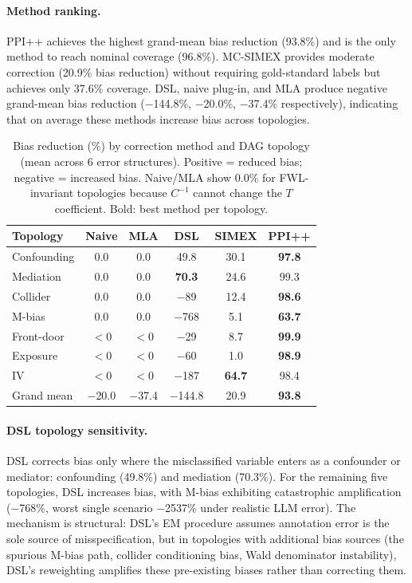 \paragraph{Method ranking.}
PPI++ achieves the highest grand-mean bias reduction (93.8\%) and is the only method to reach nominal coverage (96.8\%). MC-SIMEX provides moderate correction (20.9\% bias reduction) without requiring gold-standard labels but achieves only 37.6\% coverage. DSL, naive plug-in, and MLA produce negative grand-mean bias reduction ($-$144.8\%, $-$20.0\%, $-$37.4\% respectively), indicating that on average these methods increase bias across topologies.

\begin{table}[t]
\centering
\caption{Bias reduction (\%) by correction method and DAG topology (mean across 6 error structures). Positive = reduced bias; negative = increased bias. Naive/MLA show 0.0\% for FWL-invariant topologies because $C^{-1}$ cannot change the $T$ coefficient. Bold: best method per topology.}
\label{tab:correction}
\small
\begin{tabular}{lccccc}
\toprule
\textbf{Topology} & \textbf{Naive} & \textbf{MLA} & \textbf{DSL} & \textbf{SIMEX} & \textbf{PPI++} \\
\midrule
Confounding & 0.0 & 0.0 & 49.8 & 30.1 & \textbf{97.8} \\
Mediation & 0.0 & 0.0 & \textbf{70.3} & 24.6 & 99.3 \\
Collider & 0.0 & 0.0 & $-$89 & 12.4 & \textbf{98.6} \\
M-bias & 0.0 & 0.0 & $-$768 & 5.1 & \textbf{63.7} \\
\midrule
Front-door & $<$0 & $<$0 & $-$29 & 8.7 & \textbf{99.9} \\
Exposure & $<$0 & $<$0 & $-$60 & 1.0 & \textbf{98.9} \\
IV & $<$0 & $<$0 & $-$187 & \textbf{64.7} & 98.4 \\
\midrule
Grand mean & $-$20.0 & $-$37.4 & $-$144.8 & 20.9 & \textbf{93.8} \\
\bottomrule
\end{tabular}
\end{table}

\paragraph{DSL topology sensitivity.}
DSL corrects bias only where the misclassified variable enters as a confounder or mediator: confounding (49.8\%) and mediation (70.3\%). For the remaining five topologies, DSL increases bias, with M-bias exhibiting catastrophic amplification ($-$768\%, worst single scenario $-$2537\% under realistic LLM error). The mechanism is structural: DSL's EM procedure assumes annotation error is the sole source of misspecification, but in topologies with additional bias sources (the spurious M-bias path, collider conditioning bias, Wald denominator instability), DSL's reweighting amplifies these pre-existing biases rather than correcting them.

